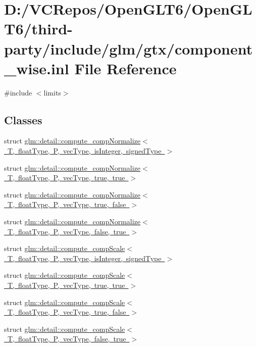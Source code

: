 \hypertarget{component__wise_8inl}{}\section{D\+:/\+V\+C\+Repos/\+Open\+G\+L\+T6/\+Open\+G\+L\+T6/third-\/party/include/glm/gtx/component\+\_\+wise.inl File Reference}
\label{component__wise_8inl}
{\ttfamily \#include $<$limits$>$}\newline
\subsection*{Classes}
\begin{DoxyCompactItemize}
\item 
struct \mbox{\hyperlink{structglm_1_1detail_1_1compute__comp_normalize}{glm\+::detail\+::compute\+\_\+comp\+Normalize$<$ T, float\+Type, P, vec\+Type, is\+Integer, signed\+Type $>$}}
\item 
struct \mbox{\hyperlink{structglm_1_1detail_1_1compute__comp_normalize_3_01_t_00_01float_type_00_01_p_00_01vec_type_00_01true_00_01true_01_4}{glm\+::detail\+::compute\+\_\+comp\+Normalize$<$ T, float\+Type, P, vec\+Type, true, true $>$}}
\item 
struct \mbox{\hyperlink{structglm_1_1detail_1_1compute__comp_normalize_3_01_t_00_01float_type_00_01_p_00_01vec_type_00_01true_00_01false_01_4}{glm\+::detail\+::compute\+\_\+comp\+Normalize$<$ T, float\+Type, P, vec\+Type, true, false $>$}}
\item 
struct \mbox{\hyperlink{structglm_1_1detail_1_1compute__comp_normalize_3_01_t_00_01float_type_00_01_p_00_01vec_type_00_01false_00_01true_01_4}{glm\+::detail\+::compute\+\_\+comp\+Normalize$<$ T, float\+Type, P, vec\+Type, false, true $>$}}
\item 
struct \mbox{\hyperlink{structglm_1_1detail_1_1compute__comp_scale}{glm\+::detail\+::compute\+\_\+comp\+Scale$<$ T, float\+Type, P, vec\+Type, is\+Integer, signed\+Type $>$}}
\item 
struct \mbox{\hyperlink{structglm_1_1detail_1_1compute__comp_scale_3_01_t_00_01float_type_00_01_p_00_01vec_type_00_01true_00_01true_01_4}{glm\+::detail\+::compute\+\_\+comp\+Scale$<$ T, float\+Type, P, vec\+Type, true, true $>$}}
\item 
struct \mbox{\hyperlink{structglm_1_1detail_1_1compute__comp_scale_3_01_t_00_01float_type_00_01_p_00_01vec_type_00_01true_00_01false_01_4}{glm\+::detail\+::compute\+\_\+comp\+Scale$<$ T, float\+Type, P, vec\+Type, true, false $>$}}
\item 
struct \mbox{\hyperlink{structglm_1_1detail_1_1compute__comp_scale_3_01_t_00_01float_type_00_01_p_00_01vec_type_00_01false_00_01true_01_4}{glm\+::detail\+::compute\+\_\+comp\+Scale$<$ T, float\+Type, P, vec\+Type, false, true $>$}}
\end{DoxyCompactItemize}
